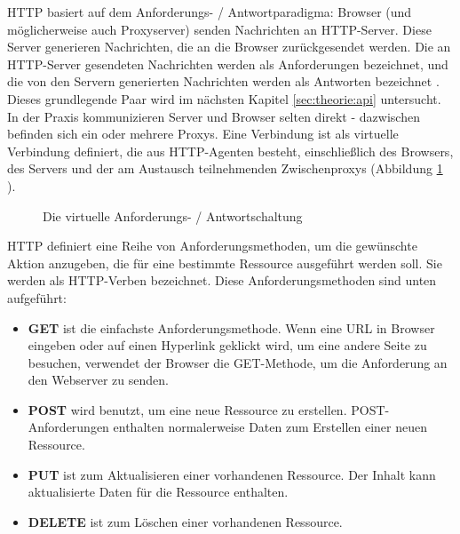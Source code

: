 HTTP basiert auf dem Anforderungs- / Antwortparadigma: Browser (und möglicherweise auch Proxyserver) senden Nachrichten an HTTP-Server. Diese Server generieren Nachrichten, die an die Browser zurückgesendet werden. Die an HTTP-Server gesendeten Nachrichten werden als Anforderungen bezeichnet, und die von den Servern generierten Nachrichten werden als Antworten bezeichnet \cite[pp.33-34]{shklar:webapplication}. Dieses grundlegende Paar wird im nächsten Kapitel \ref{sec:theorie:api} untersucht. In der Praxis kommunizieren Server und Browser selten direkt - dazwischen befinden sich ein oder mehrere Proxys. Eine Verbindung ist als virtuelle Verbindung definiert, die aus HTTP-Agenten besteht, einschließlich des Browsers, des Servers und der am Austausch teilnehmenden Zwischenproxys (Abbildung \ref{fig:http_req} \cite[pp.33-34]{shklar:webapplication}).
\begin{figure}
	\centering
	\caption{Die virtuelle Anforderungs- / Antwortschaltung}
	\label{fig:http_req}
\end{figure}

HTTP definiert eine Reihe von Anforderungsmethoden, um die gewünschte Aktion anzugeben, die für eine bestimmte Ressource ausgeführt werden soll. Sie werden als HTTP-Verben bezeichnet.
Diese Anforderungsmethoden sind unten aufgeführt:
\begin{itemize}
	\item \textbf{GET} ist die einfachste Anforderungsmethode. Wenn eine URL in Browser eingeben oder auf einen Hyperlink geklickt wird, um eine andere Seite zu besuchen, verwendet der Browser die GET-Methode, um die Anforderung an den Webserver zu senden.
	\item \textbf{POST} wird benutzt, um eine neue Ressource zu erstellen. POST-Anforderungen enthalten normalerweise Daten zum Erstellen einer neuen Ressource.
	\item \textbf{PUT} ist zum Aktualisieren einer vorhandenen Ressource. Der Inhalt kann aktualisierte Daten für die Ressource enthalten.
	\item \textbf{DELETE} ist zum Löschen einer vorhandenen Ressource.
\end{itemize}

